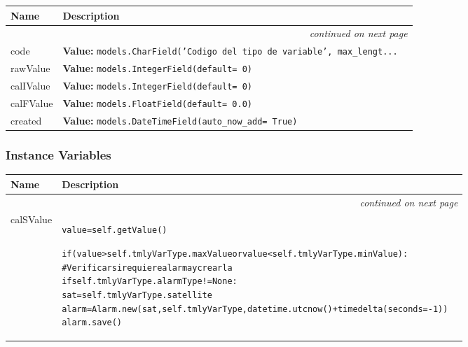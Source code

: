     \vspace{-1cm}
\hspace{\varindent}\begin{longtable}{|p{\varnamewidth}|p{\vardescrwidth}|l}
\cline{1-2}
\cline{1-2} \centering \textbf{Name} & \centering \textbf{Description}& \\
\cline{1-2}
\endhead\cline{1-2}\multicolumn{3}{r}{\small\textit{continued on next page}}\\\endfoot\cline{1-2}
\endlastfoot\raggedright c\-o\-d\-e\- & \raggedright \textbf{Value:} 
{\tt models.CharField('Codigo del tipo de variable', max\_lengt\texttt{...}}&\\
\cline{1-2}
\raggedright r\-a\-w\-V\-a\-l\-u\-e\- & \raggedright \textbf{Value:} 
{\tt models.IntegerField(default= 0)}&\\
\cline{1-2}
\raggedright c\-a\-l\-I\-V\-a\-l\-u\-e\- & \raggedright \textbf{Value:} 
{\tt models.IntegerField(default= 0)}&\\
\cline{1-2}
\raggedright c\-a\-l\-F\-V\-a\-l\-u\-e\- & \raggedright \textbf{Value:} 
{\tt models.FloatField(default= 0.0)}&\\
\cline{1-2}
\raggedright c\-r\-e\-a\-t\-e\-d\- & \raggedright \textbf{Value:} 
{\tt models.DateTimeField(auto\_now\_add= True)}&\\
\cline{1-2}
\end{longtable}



  \subsubsection{Instance Variables}

    \vspace{-1cm}
\hspace{\varindent}\begin{longtable}{|p{\varnamewidth}|p{\vardescrwidth}|l}
\cline{1-2}
\cline{1-2} \centering \textbf{Name} & \centering \textbf{Description}& \\
\cline{1-2}
\endhead\cline{1-2}\multicolumn{3}{r}{\small\textit{continued on next page}}\\\endfoot\cline{1-2}
\endlastfoot\raggedright c\-a\-l\-S\-V\-a\-l\-u\-e\- & \begin{alltt}

value = self.getValue()


if (value{\textgreater}self.tmlyVarType.maxValue or value{\textless}self.tmlyVarType.minValue):
    \#Verificar si requiere alarma y crearla
    if self.tmlyVarType.alarmType != None:
        sat = self.tmlyVarType.satellite
        alarm = Alarm.new(sat, self.tmlyVarType, datetime.utcnow() + timedelta(seconds=-1))
        alarm.save()
\end{alltt}&\\
\cline{1-2}
\end{longtable}


